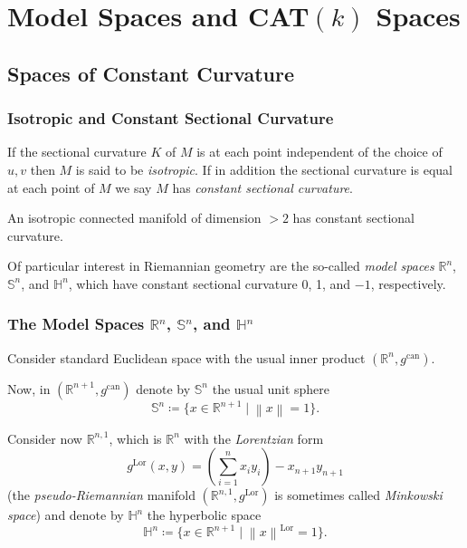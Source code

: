 \documentclass[handout]{beamer}
\DeclareMathOperator{\can}{can}
\DeclareMathOperator{\Lor}{Lor}
\newcommand{\Sp}{\mathbb{S}}
\newcommand{\Hy}{\mathbb{H}}
\newcommand{\R}{\mathbb{R}}
\newcommand{\norm}[1]{\left\lVert#1\right\rVert}
\theoremstyle{definition}
\begin{document}
\section{Model Spaces and CAT$(k)$ Spaces}

\subsection{Spaces of Constant Curvature}

\begin{frame}
    \frametitle{Isotropic and Constant Sectional Curvature}

    \pause
    \begin{definition}
        If the sectional curvature $K$ of $M$ is at each point independent of the
        choice of $u,v$ then $M$ is said to be \emph{isotropic}. If in addition
        the sectional curvature is equal at each point of $M$ we say $M$ has
        \emph{constant sectional curvature}.
    \end{definition}

    \pause
    \begin{lemma}
        An isotropic connected manifold of dimension $> 2$ has constant sectional curvature.
    \end{lemma}

    \pause
    Of particular interest in Riemannian geometry are the so-called
    \emph{model spaces} $\R^n$, $\Sp^n$, and $\Hy^n$, which have constant
    sectional curvature 0, 1, and $-1$, respectively.

\end{frame}

\begin{frame}
    \frametitle{The Model Spaces $\R^n$, $\Sp^n$, and $\Hy^n$}

    Consider standard Euclidean space with the usual inner product $(\R^n, g^{\can})$.

    \pause
    Now, in $(\R^{n+1}, g^{\can})$ denote by $\Sp^n$ the usual unit sphere
    \[
      \Sp^n \coloneqq \{x \in \R^{n+1} \mid \norm{x} = 1\}.
    \]

    \pause
    Consider now $\R^{n,1}$, which is $\R^n$ with the \emph{Lorentzian} form
    \[
        g^{\Lor}(x,y) = \left(\sum_{i=1}^n x_i y_i\right) - x_{n+1}y_{n+1}
    \]
    (the \emph{pseudo-Riemannian} manifold $(\R^{n,1},g^{\Lor})$ is sometimes
    called \emph{Minkowski space})
    and denote by $\Hy^n$ the hyperbolic space
    \[
      \Hy^n \coloneqq \{x \in \R^{n+1} \mid \norm{x}^{\Lor} = 1\}.
    \]
\end{frame}
\end{document}
